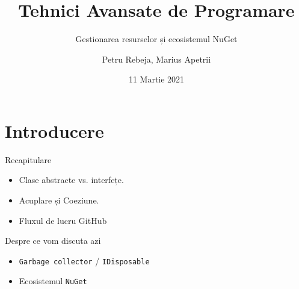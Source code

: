 \documentclass[presentation]{beamer}
\author{Petru Rebeja, Marius Apetrii}
\date{11 Martie 2021}
\title{Tehnici Avansate de Programare}
\subtitle{Gestionarea resurselor și ecosistemul NuGet}
\institute[UAIC]{Facultatea de Matematică\\Universitatea Alexandru Ioan Cuza, Iași}
\begin{document}
\maketitle
\section{Introducere}
\label{sec:orgbe8c593}
\begin{frame}[label={sec:org849d015}]{Recapitulare}
\begin{itemize}
\item Clase abstracte vs. interfețe.
\item Acuplare și Coeziune.
\item Fluxul de lucru GitHub
\end{itemize}
\end{frame}
\begin{frame}[label={sec:org610bce9},fragile]{Despre ce vom discuta azi}
 \begin{itemize}
\item \texttt{Garbage collector} / \texttt{IDisposable}
\item Ecosistemul \texttt{NuGet}
\end{itemize}
\end{frame}
\end{document}
